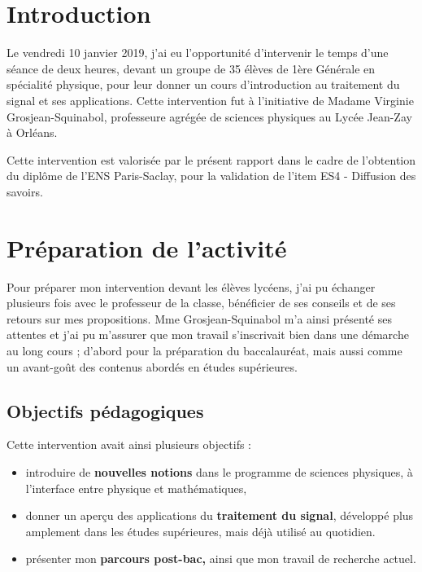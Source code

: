 \documentclass[12pt]{article}
\begin{document}
\section{Introduction}

Le vendredi 10 janvier 2019, j'ai eu l'opportunité d'intervenir le temps d'une séance de deux heures, devant un groupe de 35 élèves de 1ère Générale en spécialité physique, pour leur donner un cours d'introduction au traitement du signal et ses applications.
Cette intervention fut à l'initiative de Madame Virginie Grosjean-Squinabol, professeure agrégée de sciences physiques au Lycée Jean-Zay à Orléans.

Cette intervention est valorisée par le présent rapport dans le cadre de l'obtention du diplôme de l'ENS Paris-Saclay, pour la validation de l'item ES4 - Diffusion des savoirs.

\section{Préparation de l'activité}

Pour préparer mon intervention devant les élèves lycéens, j'ai pu échanger plusieurs fois avec le professeur de la classe, bénéficier de ses conseils et de ses retours sur mes propositions.
Mme Grosjean-Squinabol m'a ainsi présenté ses attentes et j'ai pu m'assurer que mon travail s'inscrivait bien dans une démarche au long cours ; d'abord pour la préparation du baccalauréat, mais aussi comme un avant-goût des contenus abordés en études supérieures.

\subsection{Objectifs pédagogiques}\label{objectifs-puxe9dagogiques}

Cette intervention avait ainsi plusieurs objectifs :

\begin{itemize}
\item
  introduire de \textbf{nouvelles notions} dans le programme de sciences
  physiques, à l'interface entre physique et mathématiques,
\item
  donner un aperçu des applications du \textbf{traitement du signal},
  développé plus amplement dans les études supérieures, mais déjà
  utilisé au quotidien.
\item
  présenter mon \textbf{parcours post-bac,} ainsi que mon travail de
  recherche actuel.
\end{itemize}
\end{document}
